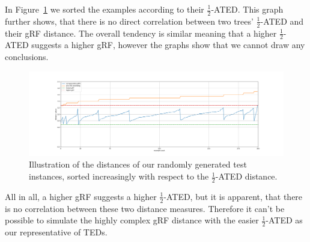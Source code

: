 In Figure~\ref{fig:ex_ated_grf} we sorted the examples according to their $\frac{1}{2}$-ATED. This graph further shows, that there is no direct correlation between two trees' $\frac{1}{2}$-ATED and their gRF distance. The overall tendency is similar meaning that a higher $\frac{1}{2}$-ATED suggests a higher gRF, however the graphs show that we cannot draw any conclusions.
\begin{figure}[!ht]
	\centering	
	\includegraphics[width=\textwidth]{figures/all_examples_ated_corr_grf.png}
	\caption{Illustration of the distances of our randomly generated test instances, sorted increasingly with respect to the $\frac{1}{2}$-ATED distance.}
	\label{fig:ex_ated_grf}
\end{figure} 

All in all, a higher gRF suggests a higher $\frac{1}{2}$-ATED, but it is apparent, that there is no correlation between these two distance measures. Therefore it can't be possible to simulate the highly complex gRF distance with the easier $\frac{1}{2}$-ATED as our representative of TEDs.
